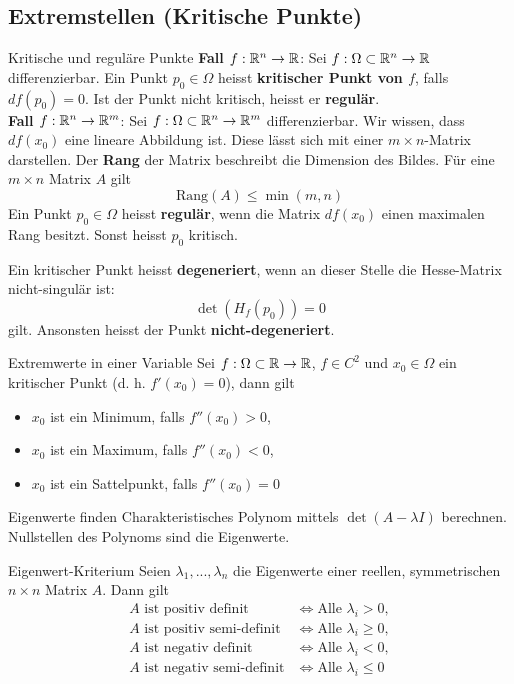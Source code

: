 \subsection{Extremstellen (Kritische Punkte)}

\begin{Definition}[label=R1]{Kritische und reguläre Punkte}{}
	\textbf{Fall $f: \mathbb{R}^n \to \mathbb{R}$}: Sei 	$f: \Omega \subset \mathbb{R}^n \to \mathbb{R}$ differenzierbar. Ein Punkt $p_0 \in \Omega$ heisst \textbf{kritischer Punkt von $f$}, falls $df(p_0)=0$. Ist der Punkt nicht kritisch, heisst er \textbf{regulär}.\\
	
	\textbf{Fall $f: \mathbb{R}^n \to \mathbb{R}^m$}: Sei $f: \Omega \subset \mathbb{R}^n \to \mathbb{R}^m$ differenzierbar. Wir wissen, dass $df(x_0)$ eine lineare Abbildung ist. Diese lässt sich mit einer $m\times n$-Matrix darstellen. Der \textbf{Rang} der Matrix beschreibt die Dimension des Bildes. Für eine $m \times n$ Matrix $A$ gilt \[\text{Rang}(A) \leq \min(m, n)\] Ein Punkt $p_0 \in \Omega$ heisst \textbf{regulär}, wenn die Matrix $df(x_0)$ einen maximalen Rang besitzt. Sonst heisst $p_0$ kritisch.
	
	Ein kritischer Punkt heisst \textbf{degeneriert}, wenn an dieser Stelle die Hesse-Matrix nicht-singulär ist: \[\det(H_f(p_0))=0\] gilt. Ansonsten heisst der Punkt \textbf{nicht-degeneriert}.
\end{Definition}

\begin{Satz}{Extremwerte in einer Variable}{}
	Sei $f: \Omega \subset \mathbb{R} \to \mathbb{R}$, $f \in C^2$ und $x_0 \in \Omega$ ein kritischer Punkt (d. h. $f'(x_0) = 0$), dann gilt
	\begin{itemize}
		\item $x_0$ ist ein Minimum, falls $f''(x_0) > 0$,
		\item $x_0$ ist ein Maximum, falls $f''(x_0) < 0$,
		\item $x_0$ ist ein Sattelpunkt, falls $f''(x_0) = 0$
	\end{itemize}
\end{Satz}

\begin{Rezept}{Eigenwerte finden}{}
	Charakteristisches Polynom mittels $\det (A-\lambda I)$ berechnen. Nullstellen des Polynoms sind die Eigenwerte.
\end{Rezept}

\begin{Satz}{Eigenwert-Kriterium}{}
	Seien $\lambda_1, ..., \lambda_n$ die Eigenwerte einer reellen, symmetrischen $n \times n$ Matrix $A$. Dann gilt
	\begin{align*}
		A \text{ ist positiv definit} &\iff \text{Alle }\lambda_i > 0,\\
		A \text{ ist positiv semi-definit} &\iff \text{Alle }\lambda_i \geq 0,\\
		A \text{ ist negativ definit} &\iff \text{Alle }\lambda_i < 0,\\
		A \text{ ist negativ semi-definit} &\iff \text{Alle }\lambda_i \leq 0
	\end{align*}
\end{Satz}

